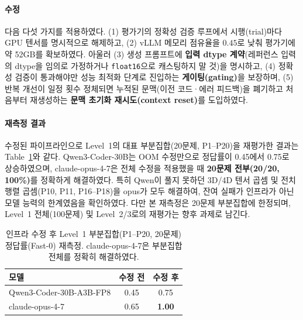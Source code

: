 \documentclass[sigplan,screen,review,anonymous]{acmart}
\begin{document}
\paragraph{수정}
다음 다섯 가지를 적용하였다.
(1) 평가기의 정확성 검증 루프에서 시행(trial)마다 GPU 텐서를 명시적으로 해제하고,
(2) vLLM 메모리 점유율을 $0.45$로 낮춰 평가기에 약 52GB를 확보하였다.
아울러 (3) 생성 프롬프트에 \textbf{입력 dtype 계약}(레퍼런스 입력의 dtype을 임의로 가정하거나 \texttt{float16}으로 캐스팅하지 말 것)을 명시하고,
(4) 정확성 검증이 통과해야만 성능 최적화 단계로 진입하는 \textbf{게이팅(gating)}을 보장하며,
(5) 반복 개선이 일정 횟수 정체되면 누적된 문맥(이전 코드·에러 피드백)을 폐기하고 처음부터 재생성하는 \textbf{문맥 초기화 재시도(context reset)}를 도입하였다.

\paragraph{재측정 결과}
수정된 파이프라인으로 Level~1의 대표 부분집합(20문제, P1--P20)을 재평가한 결과는 Table~\ref{tab:remeasure}와 같다. Qwen3-Coder-30B는 OOM 수정만으로 정답률이 0.45에서 0.75로 상승하였으며, claude-opus-4-7은 전체 수정을 적용했을 때 \textbf{20문제 전부(20/20, 100\%)}를 정확하게 해결하였다. 특히 Qwen이 풀지 못하던 3D/4D 텐서 곱셈 및 전치 행렬 곱셈(P10, P11, P16--P18)을 opus가 모두 해결하여, 잔여 실패가 인프라가 아닌 모델 능력의 한계였음을 확인하였다. 다만 본 재측정은 20문제 부분집합에 한정되며, Level~1 전체(100문제) 및 Level~2/3로의 재평가는 향후 과제로 남긴다.

\begin{table}[t]
\centering
\caption{인프라 수정 후 Level~1 부분집합(P1--P20, 20문제) 정답률(Fast-0) 재측정. claude-opus-4-7은 부분집합 전체를 정확히 해결하였다.}
\label{tab:remeasure}
\begin{tabular}{lcc}
\toprule
\textbf{모델} & \textbf{수정 전} & \textbf{수정 후} \\
\midrule
Qwen3-Coder-30B-A3B-FP8 & 0.45 & 0.75 \\
claude-opus-4-7 & 0.65 & \textbf{1.00} \\
\bottomrule
\end{tabular}
\end{table}
\end{document}
